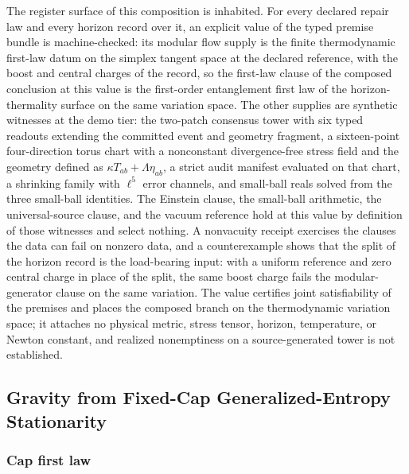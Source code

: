 The register surface of this composition is inhabited. For every declared
repair law and every horizon record over it, an explicit value of the typed
premise bundle is machine-checked: its modular flow supply is the finite
thermodynamic first-law datum on the simplex tangent space at the declared
reference, with the boost and central charges of the record, so the first-law
clause of the composed conclusion at this value is the first-order
entanglement first law of the horizon-thermality surface on the same
variation space. The other supplies are synthetic witnesses at the demo tier:
the two-patch consensus tower with six typed readouts extending the committed
event and geometry fragment, a sixteen-point four-direction torus chart with a
nonconstant divergence-free stress field and the geometry defined as
\(\kappa T_{ab}+\Lambda\eta_{ab}\), a strict audit manifest evaluated on that
chart, a shrinking family with \(\ell^{5}\) error channels, and small-ball
reals solved from the three small-ball identities. The Einstein clause, the
small-ball arithmetic, the universal-source clause, and the vacuum reference
hold at this value by definition of those witnesses and select nothing. A
nonvacuity receipt exercises the clauses the data can fail on nonzero data,
and a counterexample shows that the split of the horizon record is the
load-bearing input: with a uniform reference and zero central charge in place
of the split, the same boost charge fails the modular-generator clause on the
same variation. The value certifies joint satisfiability of the premises and
places the composed branch on the thermodynamic variation space; it attaches
no physical metric, stress tensor, horizon, temperature, or Newton constant,
and realized nonemptiness on a source-generated tower is not established.

\subsection{Gravity from Fixed-Cap Generalized-Entropy Stationarity}\label{5-gravity-from-entanglement-equilibrium}

\subsubsection{Cap first law}\label{51-cap-first-law}

